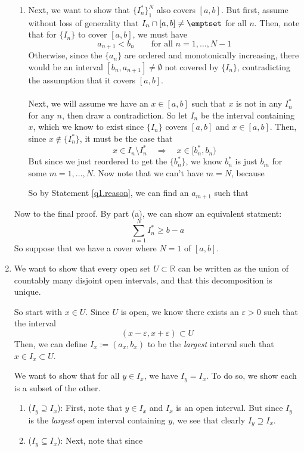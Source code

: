 \documentclass[12pt]{article}
\theoremstyle{plain}
\theoremstyle{definition}
\theoremstyle{remark}
\begin{document}
\begin{enumerate}
\begin{enumerate}
\item Next, we want to show that $\{I_n^*\}^N_1$ also covers $[a,b]$. But first, assume without loss of generality that $I_n\cap [a,b] \neq \emptset$ for all $n$. Then, note that for $\{I_n\}$ to cover $[a,b]$, we must have 
\begin{equation}
    \label{q1.reason}
    a_{n+1} < b_n 
    \qquad \text{for all $n=1,\ldots,N-1$}
\end{equation}
Otherwise, since the $\{a_n\}$ are ordered and monotonically increasing, there would be an interval $[b_n, a_{n+1}]\neq\emptyset$ not covered by $\{I_n\}$, contradicting the assumption that it covers $[a,b]$.
\\
\\
Next, we will assume we have an $x\in[a,b]$ such that $x$ is not in any $I_n^*$ for any $n$, then draw a contradiction. So let $I_n$ be the interval containing $x$, which we know to exist since $\{I_n\}$ covers $[a,b]$ and $x\in[a,b]$. Then, since $x\not\in \{I_n^*\}$, it must be the case that
\[
    x \in I_n \setminus I_n^* \quad \Rightarrow \quad
    x \in [b_n^*, b_n)
\]
But since we just reordered to get the $\{b_n^*\}$, we know $b_n^*$ is just $b_m$ for some $m=1,\ldots,N$. Now note that we can't have $m=N$, because 

So by Statement \ref{q1.reason}, we can find an $a_{m+1}$ such that 

\end{enumerate}

Now to the final proof. By part (a), we can show an equivalent statment:
\begin{equation}
    \label{q1.toshow}
    \sum_{n=1}^N I^*_n \geq b - a
\end{equation}
So suppose that we have a cover where $N=1$ of $[a,b]$. 


\item We want to show that every open set $U\subset\mathbb{R}$ can be written as the union of countably many disjoint open intervals, and that this decomposition is unique.

So start with $x\in U$. Since $U$ is open, we know there exists an $\varepsilon>0$ such that the interval
\begin{equation}
    (x-\varepsilon, x+\varepsilon) \subset U
\end{equation}
Then, we can define $I_x:=(a_x, b_x)$ to be the \emph{largest} interval such that $x\in I_x \subset U$.

We want to show that for all $y\in I_x$, we have $I_y = I_x$. To do so, we show each is a subset of the other.
\begin{enumerate}
    \item ($I_y\supseteq I_x$): First, note that $y\in I_x$ and $I_x$ is an open interval. But since $I_y$ is the \emph{largest} open interval containing $y$, we see that clearly $I_y\supseteq I_x$. 
    \item ($I_y\subseteq I_x$): Next, note that since 
    

\end{enumerate}
\end{enumerate}
\end{document}
